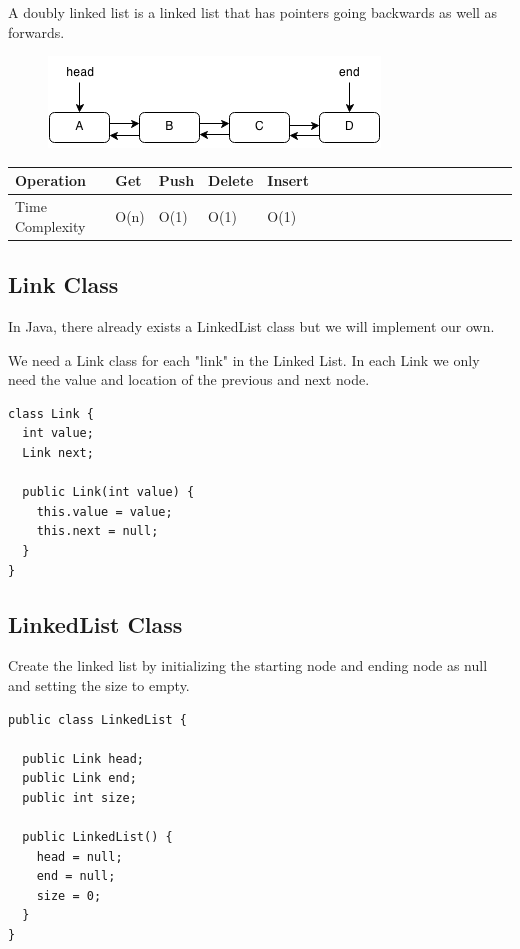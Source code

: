\documentclass[11pt,oneside]{book}
\makeatletter
\def\maxwidth#1{\ifdim\Gin@nat@width>#1 #1\else\Gin@nat@width\fi}
\makeatother
\begin{document}
A doubly linked list is a linked list that has pointers going backwards as well as forwards.

\vspace{5px}\begin{figure}[H]\centering
        \includegraphics[width=0.66\maxwidth{\textwidth}]{doublelinkedlist.png}
        \end{figure}

\begin{center}\begin{tabulary}{0.4\linewidth}{|l|l|l|l|l|l|l|l|l|l|l|l|l|l|l|l|l|l|l}\hline


  Operation &
  Get &
  Push &
  Delete &
  Insert\\
\hline


  Time Complexity &
  O(n) &
  O(1) &
  O(1) &
  O(1)\\

\hline\end{tabulary}\end{center}

\subsection{Link Class}

In Java, there already exists a LinkedList class but we will implement our own.

We need a Link class for each "link" in the Linked List. In each Link we only need the value and location of the previous and next node.

\begin{lstlisting}
class Link {
  int value;
  Link next;

  public Link(int value) {
    this.value = value;
    this.next = null;
  }
}
\end{lstlisting}

\subsection{LinkedList Class}

Create the linked list by initializing the starting node and ending node as null and setting the size to empty.

\begin{lstlisting}
public class LinkedList {

  public Link head;
  public Link end;
  public int size;

  public LinkedList() {
    head = null;
    end = null;
    size = 0;
  }
}
\end{lstlisting}
\end{document}
